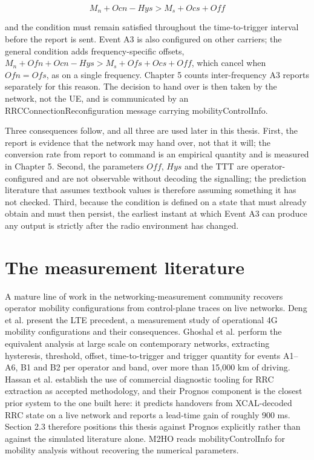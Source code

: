 \begin{equation}\label{eq:2_1} M_n + \mathit{Ocn} - \mathit{Hys} > M_s + \mathit{Ocs} + \mathit{Off} \end{equation}

and the condition must remain satisfied throughout the time-to-trigger interval before the report is sent. Event A3 is also configured on other carriers; the general condition adds frequency-specific offsets, $M_n + \mathit{Ofn} + \mathit{Ocn} - \mathit{Hys} > M_s + \mathit{Ofs} + \mathit{Ocs} + \mathit{Off}$, which cancel when $\mathit{Ofn} = \mathit{Ofs}$, as on a single frequency. Chapter 5 counts inter-frequency A3 reports separately for this reason. The decision to hand over is then taken by the network, not the UE, and is communicated by an RRCConnectionReconfiguration message carrying mobilityControlInfo.

Three consequences follow, and all three are used later in this thesis. First, the report is evidence that the network may hand over, not that it will; the conversion rate from report to command is an empirical quantity and is measured in Chapter 5. Second, the parameters $\mathit{Off}$, $\mathit{Hys}$ and the TTT are operator-configured and are not observable without decoding the signalling; the prediction literature that assumes textbook values is therefore assuming something it has not checked. Third, because the condition is defined on a state that must already obtain and must then persist, the earliest instant at which Event A3 can produce any output is strictly after the radio environment has changed.


\section{The measurement literature}
\label{sec:2_2}

A mature line of work in the networking-measurement community recovers operator mobility configurations from control-plane traces on live networks. Deng et al. \cite{ref3} present the LTE precedent, a measurement study of operational 4G mobility configurations and their consequences. Ghoshal et al. \cite{ref4} perform the equivalent analysis at large scale on contemporary networks, extracting hysteresis, threshold, offset, time-to-trigger and trigger quantity for events A1--A6, B1 and B2 per operator and band, over more than 15,000 km of driving. Hassan et al. \cite{ref5} establish the use of commercial diagnostic tooling for RRC extraction as accepted methodology, and their Prognos component is the closest prior system to the one built here: it predicts handovers from XCAL-decoded RRC state on a live network and reports a lead-time gain of roughly 900 ms. Section 2.3 therefore positions this thesis against Prognos explicitly rather than against the simulated literature alone. M2HO \cite{ref6} reads mobilityControlInfo for mobility analysis without recovering the numerical parameters.

